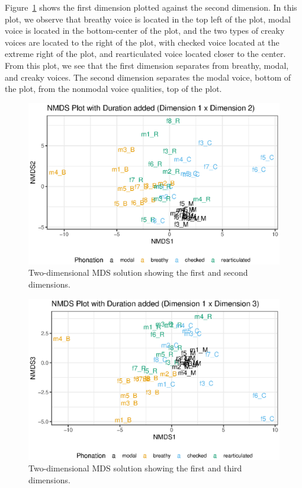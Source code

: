 Figure~\ref{fig:nmds12} shows the first dimension plotted against the second dimension. In  this plot, we observe that breathy voice is located in the top left of the plot, modal voice is located in the bottom-center of the plot, and the two types of creaky voices are located to the right of the plot, with checked voice located at the extreme right of the plot, and rearticulated voice located closer to the center. From this plot, we see that the first dimension separates from breathy, modal, and creaky voices. The second dimension separates the modal voice, bottom of the plot, from the nonmodal voice qualities, top of the plot.

\begin{figure}[!ht]
    \centering
    \includegraphics[width = 0.9\linewidth]{images/MDS/nmds12_dur.eps}
    \caption{Two-dimensional MDS solution showing the first and second dimensions.}
    \label{fig:nmds12}
\end{figure}

\begin{figure}[!ht]
    \centering
    \includegraphics[width = 0.9\linewidth]{images/MDS/nmds13_dur.eps}
    \caption{Two-dimensional MDS solution showing the first and third dimensions.}
    \label{fig:nmds13}
\end{figure}

